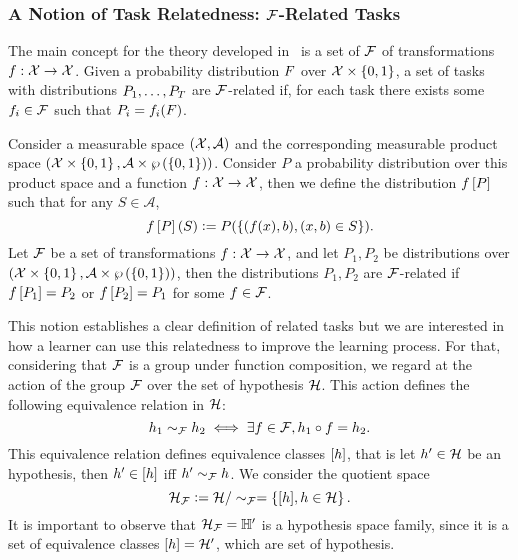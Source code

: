 \subsubsection*{A Notion of Task Relatedness: $\mathcal{F}$-Related Tasks}
The main concept for the theory developed in~\cite{Ben-DavidB08} is a set of $\mathcal{F}$ of transformations $f: \mathcal{X} \to \mathcal{X}$. Given a probability distribution $F$ over $\mathcal{X} \times \left\{0, 1\right\}$, a set of tasks with distributions $P_1, \ldots, P_T$ are $\mathcal{F}$-related if, for each task there exists some $f_i \in \mathcal{F}$ such that $P_i = f_i(F)$.

\begin{definition}\label{def:frel_tasks}
    Consider a measurable space $(\mathcal{X}, \mathcal{A})$ and the corresponding measurable product space $(\mathcal{X} \times \left\{0, 1\right\}, \mathcal{A} \times \wp\left( \left\{0, 1\right\} \right))$. Consider $P$ a probability distribution over this product space and a function $f: \mathcal{X} \to \mathcal{X}$, then we define the distribution $f\left[ P \right]$ such that for any $S \in \mathcal{A}$,
    $$ f\left[ P \right](S) \vcentcolon= P(\left\{(f(x), b), (x, b) \in S \right\}).$$
    Let $\mathcal{F}$ be a set of transformations $f: \mathcal{X} \to \mathcal{X}$, and let $P_1, P_2$ be distributions over $(\mathcal{X} \times \left\{0, 1\right\}, \mathcal{A} \times \wp\left( \left\{0, 1\right\} \right))$, then the distributions $P_1, P_2$ are $\mathcal{F}$-related if $f\left[ P_1 \right]= P_2$ or $f\left[ P_2 \right] = P_1$ for some $f \in \mathcal{F}$.
\end{definition}
This notion establishes a clear definition of related tasks but we are interested in how a learner can use this relatedness to improve the learning process.
For that, considering that $\mathcal{F}$ is a group under function composition, we regard at the action of the group $\mathcal{F}$ over the set of hypothesis $\mathcal{H}$. This action defines the following equivalence relation in $\mathcal{H}$:
$$ h_1 \sim_{\mathcal{F}} h_2 \iff \exists f \in \mathcal{F},  h_1 \circ f = h_2 .$$
%
This equivalence relation defines equivalence classes $\lbrack h\rbrack$, that is let $h' \in \mathcal{H}$ be an hypothesis, then $h' \in \lbrack h\rbrack$ iff $h' \sim_{\mathcal{F}} h$. 
We consider the quotient space 
$$\mathcal{H}_{\mathcal{F}} \vcentcolon= \mathcal{H} / \sim_{\mathcal{F}} = \left\{\lbrack h\rbrack, h \in \mathcal{H}\right\}.$$
It is important to observe that $\mathcal{H}_{\mathcal{F}} = \mathbb{H}'$ is a hypothesis space family, since it is a set of equivalence classes $\lbrack h\rbrack = \mathcal{H}'$, which are set of hypothesis.
%

